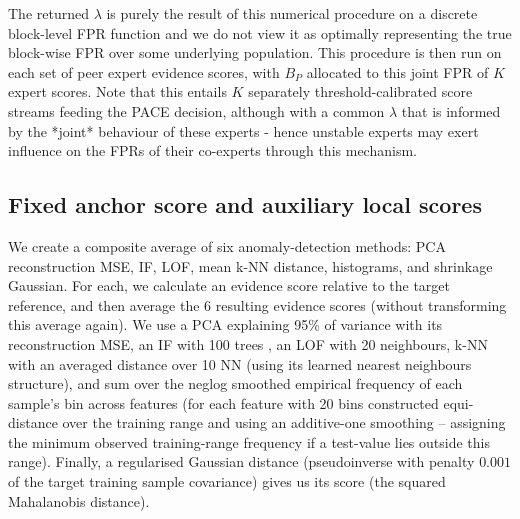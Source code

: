 The returned $\lambda$ is purely the result of this numerical procedure on a discrete block-level FPR function and we do not view it as optimally representing the true block-wise FPR over some underlying population. This procedure is then run on each set of peer expert evidence scores, with $B_P$ allocated to this joint FPR of $K$ expert scores. Note that this entails $K$ separately threshold-calibrated score streams feeding the PACE decision, although with a common $\lambda$ that is informed by the *joint* behaviour of these experts - hence unstable experts may exert influence on the FPRs of their co-experts through this mechanism.

\FloatBarrier 
\subsection{Fixed anchor score and auxiliary local scores} 
We create a composite average of six anomaly-detection methods: PCA reconstruction MSE, IF, LOF, mean k-NN distance, histograms, and shrinkage Gaussian. For each, we calculate an evidence score relative to the target reference, and then average the $6$ resulting evidence scores (without transforming this average again). We use a PCA explaining 95\% of variance with its reconstruction MSE, an IF with 100 trees \cite{liu2008isolation}, an LOF \cite{breunig2000lof} with 20 neighbours, k-NN with an averaged distance over 10 NN (using its learned nearest neighbours structure), and sum over the neglog smoothed empirical frequency of each sample's bin across features (for each feature with 20 bins constructed equi-distance over the training range and using an additive-one smoothing -- assigning the minimum observed training-range frequency if a test-value lies outside this range). Finally, a regularised Gaussian distance (pseudoinverse with penalty $0.001$ of the target training sample covariance) gives us its score (the squared Mahalanobis distance).

